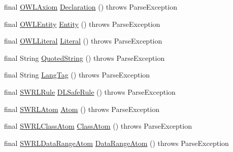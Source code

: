 \begin{DoxyCompactItemize}
\item 
final \hyperlink{interfaceorg_1_1semanticweb_1_1owlapi_1_1model_1_1_o_w_l_axiom}{O\-W\-L\-Axiom} \hyperlink{classorg_1_1coode_1_1owlapi_1_1functionalparser_1_1_o_w_l_functional_syntax_parser_a256956ffb4daab63338ec388a98d2aae}{Declaration} ()  throws Parse\-Exception 
\item 
final \hyperlink{interfaceorg_1_1semanticweb_1_1owlapi_1_1model_1_1_o_w_l_entity}{O\-W\-L\-Entity} \hyperlink{classorg_1_1coode_1_1owlapi_1_1functionalparser_1_1_o_w_l_functional_syntax_parser_ab566e5d83477c2a207c55c0e30344267}{Entity} ()  throws Parse\-Exception 
\item 
final \hyperlink{interfaceorg_1_1semanticweb_1_1owlapi_1_1model_1_1_o_w_l_literal}{O\-W\-L\-Literal} \hyperlink{classorg_1_1coode_1_1owlapi_1_1functionalparser_1_1_o_w_l_functional_syntax_parser_af0c9d0c4a6b78251e7ec9fc205a8ca4c}{Literal} ()  throws Parse\-Exception 
\item 
final String \hyperlink{classorg_1_1coode_1_1owlapi_1_1functionalparser_1_1_o_w_l_functional_syntax_parser_a3029b1025cd2be3dc728fea82c456cb6}{Quoted\-String} ()  throws Parse\-Exception 
\item 
final String \hyperlink{classorg_1_1coode_1_1owlapi_1_1functionalparser_1_1_o_w_l_functional_syntax_parser_a8d61ec490b5f442015daafaedf6015e0}{Lang\-Tag} ()  throws Parse\-Exception 
\item 
final \hyperlink{interfaceorg_1_1semanticweb_1_1owlapi_1_1model_1_1_s_w_r_l_rule}{S\-W\-R\-L\-Rule} \hyperlink{classorg_1_1coode_1_1owlapi_1_1functionalparser_1_1_o_w_l_functional_syntax_parser_a57218b555593abf93478f9ce4478295c}{D\-L\-Safe\-Rule} ()  throws Parse\-Exception 
\item 
final \hyperlink{interfaceorg_1_1semanticweb_1_1owlapi_1_1model_1_1_s_w_r_l_atom}{S\-W\-R\-L\-Atom} \hyperlink{classorg_1_1coode_1_1owlapi_1_1functionalparser_1_1_o_w_l_functional_syntax_parser_a311ef51a8ff1230cd34953f6ef47679c}{Atom} ()  throws Parse\-Exception 
\item 
final \hyperlink{interfaceorg_1_1semanticweb_1_1owlapi_1_1model_1_1_s_w_r_l_class_atom}{S\-W\-R\-L\-Class\-Atom} \hyperlink{classorg_1_1coode_1_1owlapi_1_1functionalparser_1_1_o_w_l_functional_syntax_parser_a7beb83fed11615c20b9aab54f919785b}{Class\-Atom} ()  throws Parse\-Exception 
\item 
final \hyperlink{interfaceorg_1_1semanticweb_1_1owlapi_1_1model_1_1_s_w_r_l_data_range_atom}{S\-W\-R\-L\-Data\-Range\-Atom} \hyperlink{classorg_1_1coode_1_1owlapi_1_1functionalparser_1_1_o_w_l_functional_syntax_parser_a2b2a92ee7d45056f2686012748f63607}{Data\-Range\-Atom} ()  throws Parse\-Exception 

\end{DoxyCompactItemize}
